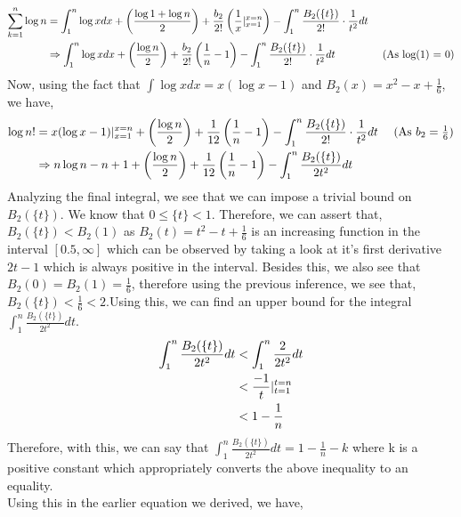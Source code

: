 \documentclass[letterpaper]{exam}
\begin{document}
\begin{questions}
\begin{solution}
\begin{align*}
 \overset{n}{\underset{k=1}{\sum}} \log{n} &= \int_{1}^{n} \log{x} dx + \left(\frac{\log{1}+\log{n}}{2}\right) + \frac{b_{2}}{2!}\left(\frac{1}{x}\Huge{|}_{x=1}^{x=n}\right) - \int_{1}^{n} \frac{B_{2}(\{t\})}{2!}\cdot\frac{1}{t^2} dt\\
 &\Rightarrow 
  \int_{1}^{n} \log{x} dx + \left(\frac{\log{n}}{2}\right) + \frac{b_{2}}{2!}\left(\frac{1}{n} - 1\right) - \int_{1}^{n} \frac{B_{2}(\{t\})}{2!}\cdot\frac{1}{t^2} dt & \mbox{ (As log(1) = 0)}
\end{align*}
Now, using the fact that $\int \log{x}dx = x(\log{x} - 1)$ and $B_{2}(x) = x^2 -x + \frac{1}{6}$, we have,
\begin{align*}
   \log{n!} &=  x(\log{x} - 1) \Huge{|}_{x=1}^{x=n}+ \left(\frac{\log{n}}{2}\right) + \frac{1}{12}\left(\frac{1}{n} - 1\right) - \int_{1}^{n} \frac{B_{2}(\{t\})}{2!}\cdot\frac{1}{t^2} dt &\mbox{ (As $b_2 = \frac{1}{6}$)}\\
   &\Rightarrow
   n\log{n} - n + 1 + \left(\frac{\log{n}}{2}\right) + \frac{1}{12}\left(\frac{1}{n} - 1\right) - \int_{1}^{n} \frac{B_{2}(\{t\})}{2t^2} dt
\end{align*}
Analyzing the final integral, we see that we can impose a trivial bound on $B_{2}(\{t\})$. We know that $0 \leq \{t\} < 1$. Therefore, we can assert that, $B_{2}(\{t\}) < B_{2}(1) $ as $B_2(t) = t^2 -t + \frac{1}{6}$ is an increasing function in the interval $[0.5,\infty]$  which can be observed by taking a look at it's first derivative $2t -1$ which is always positive in the interval. Besides this, we also see that $B_{2}(0) = B_2(1) = \frac{1}{6}$, therefore using the previous inference, we see that, $B_{2}(\{t\})< \frac{1}{6} < 2$.Using this, we can find an upper bound for the integral $\int_{1}^{n} \frac{B_{2}(\{t\})}{2t^2} dt$.\\
\begin{align*}
    \int_{1}^{n} \frac{B_{2}(\{t\})}{2t^2} dt &< \int_{1}^{n} \frac{2}{2t^2} dt\\
    &<
    \frac{-1}{t}\Huge{|}_{t = 1}^{t=n}\\
    &<
    1 - \frac{1}{n}
\end{align*}
Therefore, with this, we can say that $\int_{1}^{n} \frac{B_{2}(\{t\})}{2t^2} dt = 1 - \frac{1}{n} - k$ where k is a positive constant which appropriately converts the above inequality to an equality.\\
Using this in the earlier equation we derived, we have,
\begin{align*}

\end{align*}
\end{solution}
\end{questions}
\end{document}
